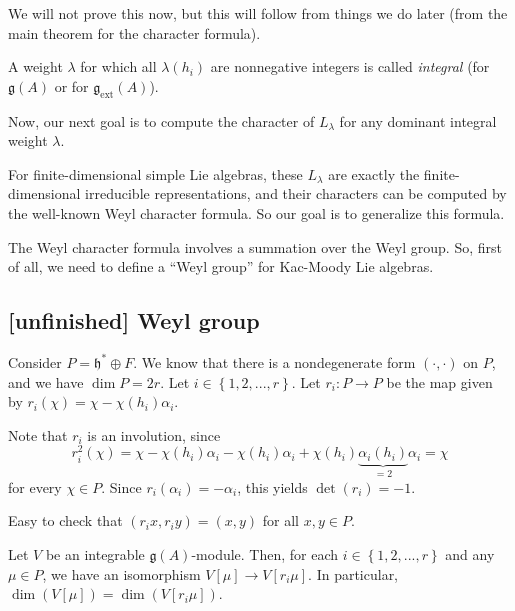\documentclass[etingof-lie.tex]{subfiles}
\begin{document}
We will not prove this now, but this will follow from things we do later (from
the main theorem for the character formula).

\begin{definition}
A weight $\lambda$ for which all $\lambda\left(  h_{i}\right)  $ are
nonnegative integers is called \textit{integral} (for $\mathfrak{g}\left(
A\right)  $ or for $\mathfrak{g}_{\operatorname*{ext}}\left(  A\right)  $).
\end{definition}

Now, our next goal is to compute the character of $L_{\lambda}$ for any
dominant integral weight $\lambda$.

For finite-dimensional simple Lie algebras, these $L_{\lambda}$ are exactly
the finite-dimensional irreducible representations, and their characters can
be computed by the well-known Weyl character formula. So our goal is to
generalize this formula.

The Weyl character formula involves a summation over the Weyl group. So, first
of all, we need to define a ``Weyl group'' for Kac-Moody Lie algebras.

\subsection{\textbf{[unfinished]} Weyl group}

\begin{definition}
Consider $P=\mathfrak{h}^{\ast}\oplus F$. We know that there is a
nondegenerate form $\left(  \cdot,\cdot\right)  $ on $P$, and we have $\dim
P=2r$. Let $i\in\left\{  1,2,...,r\right\}  $. Let $r_{i}:P\rightarrow P$ be
the map given by $r_{i}\left(  \chi\right)  =\chi-\chi\left(  h_{i}\right)
\alpha_{i}$.
\end{definition}

Note that $r_{i}$ is an involution, since%
\[
r_{i}^{2}\left(  \chi\right)  =\chi-\chi\left(  h_{i}\right)  \alpha_{i}%
-\chi\left(  h_{i}\right)  \alpha_{i}+\chi\left(  h_{i}\right)
\underbrace{\alpha_{i}\left(  h_{i}\right)  }_{=2}\alpha_{i}=\chi
\]
for every $\chi\in P$. Since $r_{i}\left(  \alpha_{i}\right)  =-\alpha_{i}$,
this yields $\det\left(  r_{i}\right)  =-1$.

Easy to check that $\left(  r_{i}x,r_{i}y\right)  =\left(  x,y\right)  $ for
all $x,y\in P$.

\begin{proposition}
Let $V$ be an integrable $\mathfrak{g}\left(  A\right)  $-module. Then, for
each $i\in\left\{  1,2,...,r\right\}  $ and any $\mu\in P$, we have an
isomorphism $V\left[  \mu\right]  \rightarrow V\left[  r_{i}\mu\right]  $. In
particular, $\dim\left(  V\left[  \mu\right]  \right)  =\dim\left(  V\left[
r_{i}\mu\right]  \right)  $.
\end{proposition}
\end{document}
